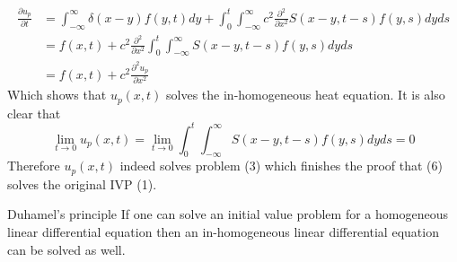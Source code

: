 \begin{align*}
    \frac{\partial u_p}{\partial t} &= \int_{-\infty}^{\infty}\delta(x-y) f(y,t) dy  + \int_{0}^{t}\int_{-\infty}^{\infty}c^2 \frac{\partial^2}{\partial x^2}S(x-y,t-s) f(y,s)dyds
    \\
    &= f(x,t) + c^2 \frac{\partial^2}{\partial x^2} \int_{0}^{t}\int_{-\infty}^{\infty}S(x-y,t-s) f(y,s)dyds
    \\
    &= f(x,t) + c^2 \frac{\partial^2 u_p}{\partial x^2}
\end{align*}
Which shows that $u_p(x,t)$ solves the in-homogeneous heat equation. It is also clear that
\[
\lim_{t \to 0} u_p(x,t)  = \lim_{t \to 0}\int_{0}^{t} \int_{-\infty}^{\infty}S(x-y,t-s) f(y,s)dyds = 0
\]
Therefore $u_p(x,t)$ indeed solves problem (3) which finishes the proof that (6) solves the original IVP (1).
\begin{enrichment*}{Duhamel's principle}
    If one can solve an initial value problem for a homogeneous linear differential equation then an in-homogeneous linear differential equation can be solved as well.
\end{enrichment*}


